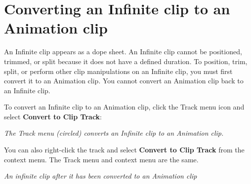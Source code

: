 \chapter{Converting an Infinite clip to an Animation clip}
\hypertarget{md__library_2_package_cache_2com_8unity_8timeline_0d1_87_86_2_documentation_0i_2wf__conv__infinite}{}\label{md__library_2_package_cache_2com_8unity_8timeline_0d1_87_86_2_documentation_0i_2wf__conv__infinite}
\label{md__library_2_package_cache_2com_8unity_8timeline_0d1_87_86_2_documentation_0i_2wf__conv__infinite_autotoc_md1270}%
%
 An Infinite clip appears as a dope sheet. An Infinite clip cannot be positioned, trimmed, or split because it does not have a defined duration. To position, trim, split, or perform other clip manipulations on an Infinite clip, you must first convert it to an Animation clip. You cannot convert an Animation clip back to an Infinite clip.

To convert an Infinite clip to an Animation clip, click the Track menu icon and select {\bfseries{Convert to Clip Track}}\+:



{\itshape The Track menu (circled) converts an Infinite clip to an Animation clip.}

You can also right-\/click the track and select {\bfseries{Convert to Clip Track}} from the context menu. The Track menu and context menu are the same.



{\itshape An infinite clip after it has been converted to an Animation clip} 
